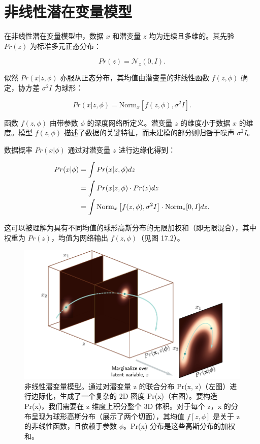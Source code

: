 \documentclass[lang=cn,newtx,10pt,scheme=chinese]{elegantbook}
\begin{document}
\section{非线性潜在变量模型}

在非线性潜在变量模型中，数据 \(x\) 和潜变量 \(z\) 均为连续且多维的。其先验 \(Pr(z)\) 为标准多元正态分布：

\begin{equation}
Pr(z) = \mathcal{N}_z(0, I). 
\end{equation}

似然 \(Pr(x|z, \phi)\) 亦服从正态分布，其均值由潜变量的非线性函数 \(f(z, \phi)\) 确定，协方差 \(\sigma^2 I\) 为球形：

\begin{equation}
Pr(x|z, \phi) = \text{Norm}_x\left[f(z, \phi), \sigma^2 I\right]. 
\end{equation}

函数 \(f(z, \phi)\) 由带参数 \(\phi\) 的深度网络所定义。潜变量 \(z\) 的维度小于数据 \(x\) 的维度。模型 \(f(z, \phi)\) 描述了数据的关键特征，而未建模的部分则归咎于噪声 \(\sigma^2I\)。

数据概率 \(Pr(x|\phi)\) 通过对潜变量 \(z\) 进行边缘化得到：


\begin{align}
Pr(x|\phi) &= \int Pr(x|z, \phi) dz \notag \\
&= \int Pr(x|z, \phi) \cdot Pr(z) dz \notag \\
&= \int \text{Norm}_x\left[f(z, \phi), \sigma^2 I\right] \cdot \text{Norm}_z[0, I] dz. 
\end{align} 


这可以被理解为具有不同均值的球形高斯分布的无限加权和（即无限混合），其中权重为 \(Pr(z)\)，均值为网络输出 \(f(z, \phi)\)（见图 17.2）。

\begin{figure}[ht!]
\centering
\includegraphics[width=0.7\linewidth]{PDFFigures/UDLChap17PDF/VAENonLinearLVM.pdf}
\caption{非线性潜变量模型。通过对潜变量 z 的联合分布 Pr(x, z)（左图）进行边际化，生成了一个复杂的 2D 密度 Pr(x)（右图）。要构造 Pr(x)，我们需要在 z 维度上积分整个 3D 体积。对于每个 z，x 的分布呈现为球形高斯分布（展示了两个切面），其均值 \(f[z, \phi]\) 是关于 z 的非线性函数，且依赖于参数 \(\phi\)。Pr(x) 分布是这些高斯分布的加权和。}
\end{figure}
\end{document}
